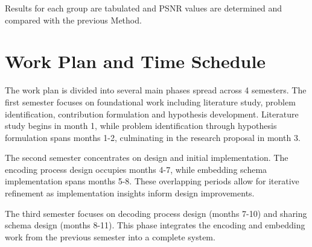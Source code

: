 \documentclass{ittelkom}
\begin{document}
Results for each group are tabulated and PSNR values are determined and
compared with the previous Method.





\section{Work Plan and Time Schedule}
The work plan is divided into several main phases spread across 4 semesters.
The first semester focuses on foundational work including literature study,
problem identification, contribution formulation and hypothesis development.
Literature study begins in month 1, while problem identification through
hypothesis formulation spans months 1-2, culminating in the research proposal
in month 3.

The second semester concentrates on design and initial implementation. The
encoding process design occupies months 4-7, while embedding schema
implementation spans months 5-8. These overlapping periods allow for iterative
refinement as implementation insights inform design improvements.

The third semester focuses on decoding process design (months 7-10) and sharing
schema design (months 8-11). This phase integrates the encoding and embedding
work from the previous semester into a complete system.
\end{document}
